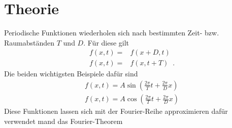 \section{Theorie}
\label{sec:Theorie}
Periodische Funktionen wiederholen sich nach bestimmten Zeit- bzw. Raumabständen
 $T$ und $D$.
Für diese gilt
\begin{align}
  f(x,t)=&f(x+D,t)\\
  f(x,t)=&f(x,t+T)\;\;.
\end{align}
Die beiden wichtigsten Beispiele dafür sind
\begin{align}
f(x,t)=A\sin\left(\frac{2\pi}{T}t+\frac{2\pi}{D}x\right) \\
f(x,t)=A\cos\left(\frac{2\pi}{T}t+\frac{2\pi}{D}x\right)
\end{align}
Diese Funktionen lassen sich mit der Fourier-Reihe approximieren dafür verwendet
mand das Fourier-Theorem
